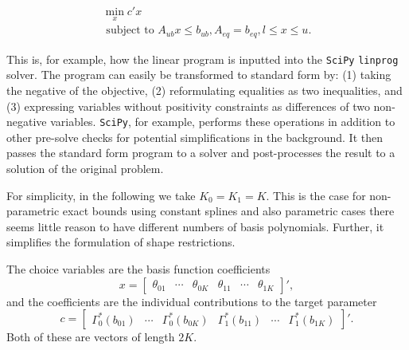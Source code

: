 \documentclass[12pt,a4paper,english]{article} %
\numberwithin{equation}{section}
\theoremstyle{definition}
\theoremstyle{remark}
\theoremstyle{plain}
\begin{document}
\begin{align}
  \min_x c'x \\
  \text{ subject to } A_{ub}x \leq b_{ub}, A_{eq} = b_{eq}, l\leq x\leq u.
\end{align}

This is, for example, how the linear program is inputted into the \texttt{SciPy} \texttt{linprog} solver.
The program can easily be transformed to standard form by: (1) taking the negative of the objective, (2) reformulating equalities as two inequalities, and (3) expressing variables without positivity constraints as differences of two non-negative variables.
\texttt{SciPy}, for example, performs these operations in addition to other pre-solve checks for potential simplifications in the background.
It then passes the standard form program to a solver and post-processes the result to a solution of the original problem.

For simplicity, in the following we take $K_0 = K_1 = K$. This is the case for non-parametric exact bounds using constant splines and also parametric cases there seems little reason to have different numbers of basis polynomials.
Further, it simplifies the formulation of shape restrictions.

The choice variables are the basis function coefficients
\begin{equation*}
  x =
  \begin{bmatrix}
     \theta_{01} & \cdots & \theta_{0K} & \theta_{11} & \cdots & \theta_{1K}
  \end{bmatrix}',
\end{equation*}
and the coefficients are the individual contributions to the target parameter
\begin{equation*}
  c =
  \begin{bmatrix}
     \Gamma_0^*(b_{01}) & \cdots & \Gamma_0^*(b_{0K}) & \Gamma_1^*(b_{11}) & \cdots & \Gamma_1^*(b_{1K})
  \end{bmatrix}'.
\end{equation*}
Both of these are vectors of length $2K$.
\end{document}
